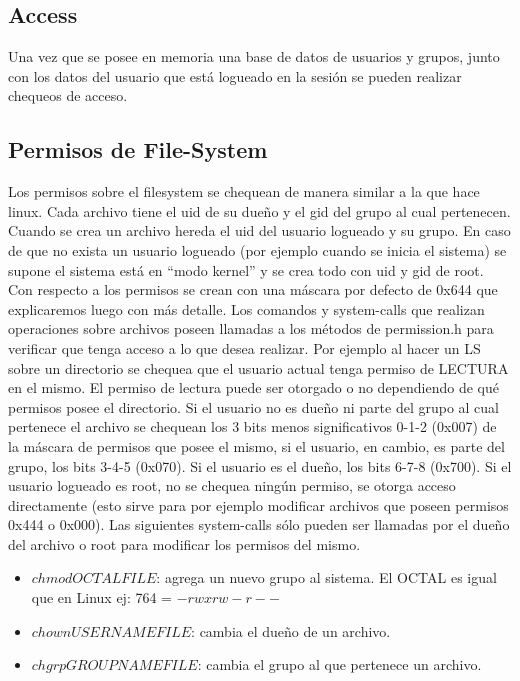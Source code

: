 \documentclass[english]{article}
\begin{document}
 
\subsection{Access}
Una vez que se posee en memoria una base de datos de usuarios y grupos, junto con los datos del usuario que está logueado en la sesión se pueden realizar chequeos de acceso.

\subsection {Permisos de File-System}
Los permisos sobre el filesystem se chequean de manera similar a la que hace linux. Cada archivo tiene el uid de su dueño y el gid del grupo al cual pertenecen.
Cuando se crea un archivo hereda el uid del usuario logueado y su grupo. En caso de que no exista un usuario logueado (por ejemplo cuando se inicia el sistema) se supone el sistema está en “modo kernel” y se crea todo con uid y gid de root. Con respecto a los permisos se crean con una máscara por defecto de 0x644 que explicaremos luego con más detalle.
Los comandos y system-calls que realizan operaciones sobre archivos poseen llamadas a los métodos de permission.h para verificar que tenga acceso a lo que desea realizar. Por ejemplo al hacer un LS sobre un directorio se chequea que el usuario actual tenga permiso de LECTURA en el mismo. El permiso de lectura puede ser otorgado o no dependiendo de qué permisos posee el directorio.
Si el usuario no es dueño ni parte del grupo al cual pertenece el archivo se chequean los 3 bits menos significativos 0-1-2 (0x007) de la máscara de permisos que posee el mismo, si el usuario, en cambio, es parte del grupo, los bits 3-4-5 (0x070). Si el usuario es el dueño, los bits 6-7-8 (0x700).
Si el usuario logueado es root, no se chequea ningún permiso, se otorga acceso directamente (esto sirve para por ejemplo modificar archivos que poseen permisos 0x444 o 0x000).
Las siguientes system-calls sólo pueden ser llamadas por el dueño del archivo o root para modificar los permisos del mismo.
\begin{itemize}
\item $chmod OCTAL FILE$: agrega un nuevo grupo al sistema.
\subitem El OCTAL es igual que en Linux ej: 764 = $-rwxrw-r--$
\item $chown USERNAME FILE$: cambia el dueño de un archivo.
\item $chgrp GROUPNAME FILE$: cambia el grupo al que pertenece un archivo.
\end{itemize}
 
\end{document}
